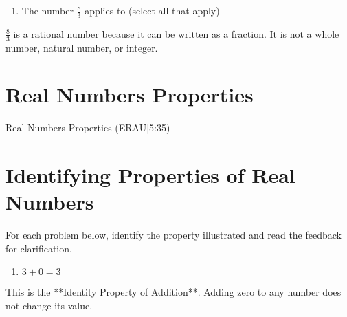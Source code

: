 \documentclass{ximera}
\begin{document}
\begin{problem}
\begin{enumerate}
\item The number $\frac{8}{3}$ applies to (select all that apply)
\begin{selectAll}
\end{selectAll}
\end{enumerate}

\begin{feedback}
$\frac{8}{3}$ is a rational number because it can be written as a fraction. It is not a whole number, natural number, or integer.
\end{feedback}
\end{problem}

\section*{Real Numbers Properties}

Real Numbers Properties (ERAU|5:35)


\section*{Identifying Properties of Real Numbers}

For each problem below, identify the property illustrated and read the feedback for clarification.

\begin{problem}
\begin{enumerate}
\item $3 + 0 = 3$ 
\end{enumerate}

\begin{feedback}
This is the **Identity Property of Addition**. Adding zero to any number does not change its value.
\end{feedback}
\end{problem}
\end{document}
